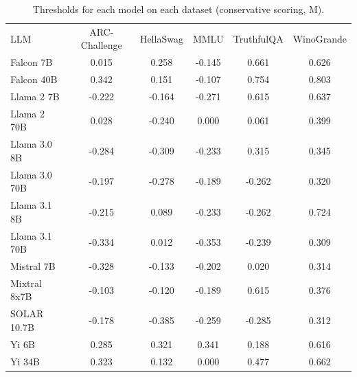 \begin{table}[h]
\caption{Thresholds for each model on each dataset (conservative scoring, M). }
\label{tab:thresholds_prob_entropy_k20_w2}
\centering
\begin{tabular}{l S[table-format=3.1] S[table-format=3.1] S[table-format=3.1] S[table-format=3.1] S[table-format=3.1]}
\toprule
LLM & ARC-Challenge & HellaSwag & MMLU & TruthfulQA & WinoGrande \\ 
\cmidrule(lr){1-1} \cmidrule(lr){2-2} \cmidrule(lr){3-3} \cmidrule(lr){4-4} \cmidrule(lr){5-5} \cmidrule(lr){6-6}
Falcon 7B & 0.015 & 0.258 & -0.145 & 0.661 & 0.626\\
Falcon 40B & 0.342 & 0.151 & -0.107 & 0.754 & 0.803\\
Llama 2 7B & -0.222 & -0.164 & -0.271 & 0.615 & 0.637\\
Llama 2 70B & 0.028 & -0.240 & 0.000 & 0.061 & 0.399\\
Llama 3.0 8B & -0.284 & -0.309 & -0.233 & 0.315 & 0.345\\
Llama 3.0 70B & -0.197 & -0.278 & -0.189 & -0.262 & 0.320\\
Llama 3.1 8B & -0.215 & 0.089 & -0.233 & -0.262 & 0.724\\
Llama 3.1 70B & -0.334 & 0.012 & -0.353 & -0.239 & 0.309\\
Mistral 7B & -0.328 & -0.133 & -0.202 & 0.020 & 0.314\\
Mixtral 8x7B & -0.103 & -0.120 & -0.189 & 0.615 & 0.376\\
SOLAR 10.7B & -0.178 & -0.385 & -0.259 & -0.285 & 0.312\\
Yi 6B & 0.285 & 0.321 & 0.341 & 0.188 & 0.616\\
Yi 34B & 0.323 & 0.132 & 0.000 & 0.477 & 0.662\\
\bottomrule
\end{tabular}
\end{table}

